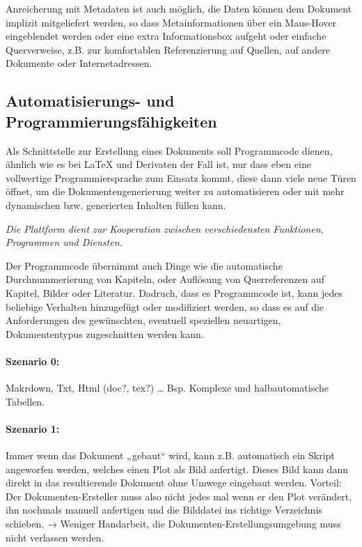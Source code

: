 Anreicherung mit Metadaten ist auch möglich, die Daten können dem Dokument
implizit mitgeliefert werden, so dass Metainformationen über ein Maus-Hover
eingeblendet werden oder eine extra Informationsbox aufgeht oder einfache
Querverweise, z.B. zur komfortablen Referenzierung auf Quellen,
auf andere Dokumente oder Internetadressen.

\subsection{Automatisierungs- und Programmierungsfähigkeiten}

Als Schnittstelle zur Erstellung eines Dokuments soll Programmcode
dienen, ähnlich wie es bei LaTeX und Derivaten der Fall ist, nur
dass eben eine vollwertige Programmiersprache zum Einsatz kommt, diese
dann viele neue Türen öffnet, um die Dokumentengenerierung weiter
zu automatisieren oder mit mehr dynamischen bzw. generierten Inhalten
füllen kann.

\emph{Die Plattform dient zur Kooperation zwischen verschiedensten
Funktionen, Programmen und Diensten.}

Der Programmcode übernimmt auch Dinge wie die automatische Durchnummerierung
von Kapiteln, oder Auflösung von Querreferenzen auf Kapitel, Bilder oder
Literatur. Dadruch, dass es Programmcode ist, kann jedes beliebige Verhalten
hinzugefügt oder modifiziert werden, so dass es auf die Anforderungen
des gewünschten, eventuell speziellen neuartigen, Dokumententypus
zugeschnitten werden kann.

\paragraph{Szenario 0:} Makrdown, Txt, Html (doc?, tex?) \ldots
Bsp. Komplexe und halbautomatische Tabellen.


\paragraph{Szenario 1:} Immer wenn das Dokument „gebaut“ wird, kann z.B.
automatisch ein Skript angeworfen werden, welches einen Plot als Bild
anfertigt. Dieses Bild kann dann direkt in das resultierende Dokument ohne
Umwege eingebaut werden. Vorteil: Der Dokumenten-Ersteller muss also nicht jedes
mal wenn er den Plot verändert, ihn nochmals manuell anfertigen und
die Bilddatei ins richtige Verzeichnis schieben. → Weniger Handarbeit,
die Dokumenten-Erstellungsumgebung muss nicht verlassen werden.

